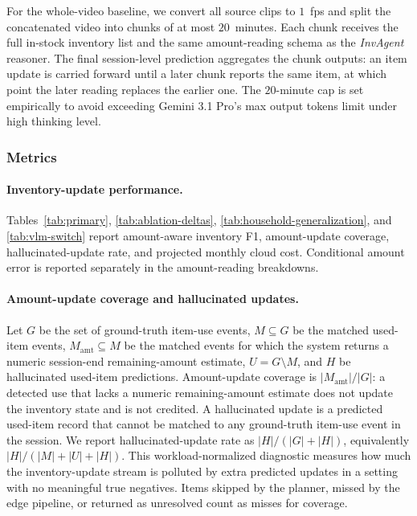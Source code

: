 \documentclass[sigconf,anonymous,nonacm]{acmart}
\newcommand{\sys}{\textit{InvAgent}\xspace}
\begin{document}
For the whole-video baseline, we convert all source clips to $1$~fps and split the concatenated video into chunks of at most
$20$~minutes. Each chunk receives the full in-stock inventory list and
the same amount-reading schema as the \sys reasoner. The final
session-level prediction aggregates the chunk outputs: an item update
is carried forward until a later chunk reports the same item, at which
point the later reading replaces the earlier one. The $20$-minute cap
is set empirically to avoid exceeding Gemini 3.1 Pro's max output tokens limit under high thinking level.


\subsubsection{Metrics}

\paragraph{Inventory-update performance.}
Tables~\ref{tab:primary}, \ref{tab:ablation-deltas},
\ref{tab:household-generalization}, and \ref{tab:vlm-switch} report
amount-aware inventory F1, amount-update coverage,
hallucinated-update rate, and projected monthly cloud cost. Conditional
amount error is reported separately in the amount-reading breakdowns.

\paragraph{Amount-update coverage and hallucinated updates.}
Let $G$ be the set of ground-truth item-use events, $M \subseteq G$ be
the matched used-item events, $M_{\mathrm{amt}} \subseteq M$ be the
matched events for which the system returns a numeric session-end
remaining-amount estimate, $U=G\setminus M$, and $H$ be hallucinated
used-item predictions. Amount-update coverage is $|M_{\mathrm{amt}}|/|G|$: a
detected use that lacks a numeric remaining-amount estimate does not
update the inventory state and is not credited. A hallucinated update is
a predicted used-item record that
cannot be matched to any ground-truth item-use event in the session. We
report hallucinated-update rate as $|H|/(|G|+|H|)$, equivalently
$|H|/(|M|+|U|+|H|)$. This workload-normalized diagnostic measures how
much the inventory-update stream is polluted by extra predicted updates
in a setting with no meaningful true negatives. Items skipped by the
planner, missed by the edge pipeline, or returned as unresolved count as
misses for coverage.
\end{document}
